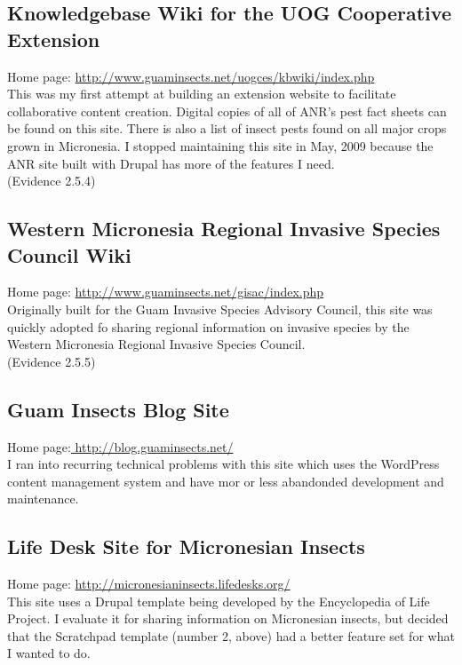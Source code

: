 \documentclass[12pt,oneside,english]{scrbook}
\begin{document}
\subsection{Knowledgebase Wiki for the UOG Cooperative Extension }

Home page: \url{http://www.guaminsects.net/uogces/kbwiki/index.php}
\textbf{}\\
This was my first attempt at building an extension website to facilitate
collaborative content creation. Digital copies of all of ANR's pest
fact sheets can be found on this site. There is also a list of insect
pests found on all major crops grown in Micronesia. I stopped maintaining
this site in May, 2009 because the ANR site built with Drupal has
more of the features I need.\\
(Evidence 2.5.4)

\subsection{Western Micronesia Regional Invasive Species Council Wiki}

Home page: \url{http://www.guaminsects.net/gisac/index.php}\\
Originally built for the Guam Invasive Species Advisory Council, this
site was quickly adopted fo sharing regional information on invasive
species by the Western Micronesia Regional Invasive Species Council.\\
(Evidence 2.5.5)

\subsection{Guam Insects Blog Site}

Home page:\url{ http://blog.guaminsects.net/} \\
I ran into recurring technical problems with this site which uses
the WordPress content management system and have mor or less abandonded
development and maintenance.

\subsection{Life Desk Site for Micronesian Insects}

Home page: \url{http://micronesianinsects.lifedesks.org/}\\
This site uses a Drupal template being developed by the Encyclopedia
of Life Project. I evaluate it for sharing information on Micronesian
insects, but decided that the Scratchpad template (number 2, above)
had a better feature set for what I wanted to do.
\end{document}
